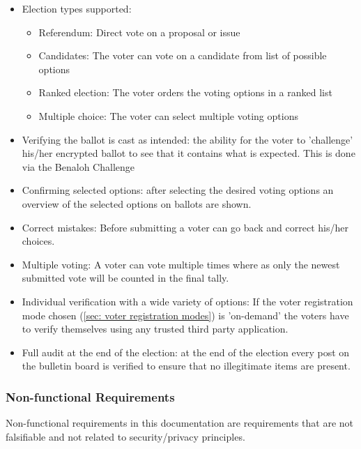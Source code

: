 \begin{itemize}
    \item Election types supported:
    \begin{itemize}
        \item Referendum: Direct vote on a proposal or issue
        \item Candidates: The voter can vote on a candidate from list of possible options
        \item Ranked election: The voter orders the voting options in a ranked list
        \item Multiple choice: The voter can select multiple voting options
    \end{itemize}
    \item Verifying the ballot is cast as intended: the ability for the voter to 'challenge' his/her encrypted ballot to see that it contains what is expected. This is done via the Benaloh Challenge
    \item Confirming selected options: after selecting the desired voting options an overview of the selected options on ballots are shown.
    \item Correct mistakes: Before submitting a voter can go back and correct his/her choices.
    \item Multiple voting: A voter can vote multiple times where as only the newest submitted vote will be counted in the final tally.
    \item Individual verification with a wide variety of options: If the voter registration mode chosen (\cref{sec: voter registration modes}) is 'on-demand' the voters have to verify themselves using any trusted third party application.
    \item Full audit at the end of the election: at the end of the election every post on the bulletin board is verified to ensure that no illegitimate items are present. 
\end{itemize}


\subsubsection{Non-functional Requirements} \label{sec: non-functional requirements}
Non-functional requirements in this documentation are requirements that are not falsifiable and not related to security/privacy principles.

